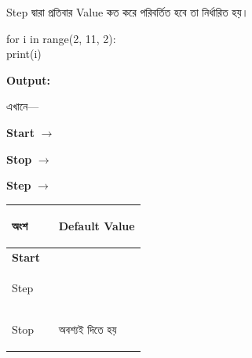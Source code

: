 

Step দ্বারা প্রতিবার Value কত করে পরিবর্তিত হবে তা নির্ধারিত হয়।

\begin{codebox}
\begin{english}
\ttfamily
for i in range(2, 11, 2):\\
\hspace*{4mm}print(i)
\end{english}
\end{codebox}

\textbf{Output:}

\begin{center}
\textenglish{    }
\end{center}

এখানে—

\begin{center}

\textbf{Start}
\(\longrightarrow\)
\textenglish{}

\qquad

\textbf{Stop}
\(\longrightarrow\)
\textenglish{}

\qquad

\textbf{Step}
\(\longrightarrow\)
\textenglish{}

\end{center}



\begin{tabularx}
{\linewidth}
{
|>{\bfseries\RaggedRight\arraybackslash}p{0.35\linewidth}
|>{\centering\arraybackslash}Y|
}

\hline
{}

\textbf{অংশ}
&
\textbf{Default Value}
\\
\hline

Start
&
\textenglish{}
\\
\hline

Step
&
\textenglish{}
\\
\hline

Stop
&
অবশ্যই দিতে হয়
\\
\hline

\end{tabularx}

